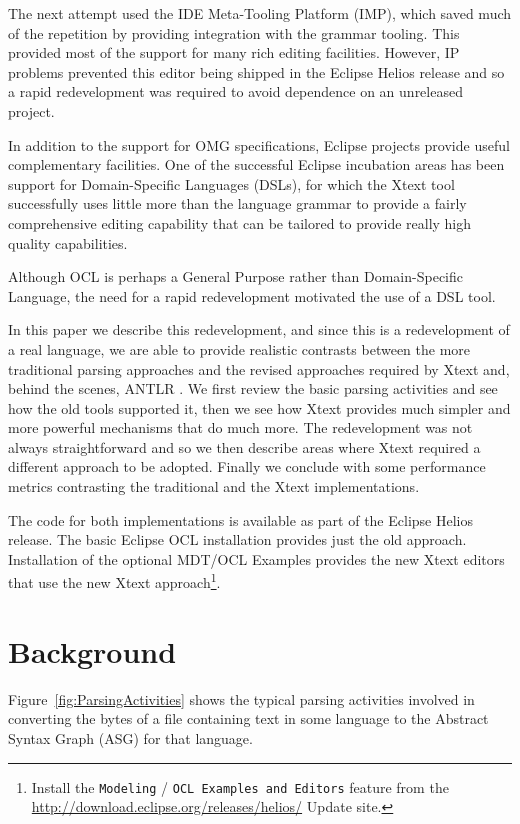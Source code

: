 \documentclass{eceasst}
\begin{document}
The next attempt used the IDE Meta-Tooling Platform (IMP)\cite{IMP}, which saved much of the repetition by providing integration with the grammar tooling. This provided most of the support for many rich editing facilities. However, IP problems prevented this editor being shipped in the Eclipse Helios\cite{Helios} release and so a rapid redevelopment was required to avoid dependence on an unreleased project.

In addition to the support for OMG specifications, Eclipse projects provide useful complementary facilities. One of the successful Eclipse incubation areas has been support for Domain-Specific Languages (DSLs), for which the Xtext\cite{TMF/Xtext} tool successfully uses little more than the language grammar to provide a fairly comprehensive editing capability that can be tailored to provide really high quality capabilities.

Although OCL is perhaps a General Purpose rather than Domain-Specific Language, the need for a rapid redevelopment motivated the use of a DSL tool.

In this paper we describe this redevelopment, and since this is a redevelopment of a real language, we are able to provide realistic contrasts between the more traditional parsing approaches and the revised approaches required by Xtext and, behind the scenes, ANTLR \cite{ANTLR}. We first review the basic parsing activities and see how the old tools supported it, then we see how Xtext provides much simpler and more powerful mechanisms that do much more. The redevelopment was not always straightforward and so we then describe areas where Xtext required a different approach to be adopted. Finally we conclude with some performance metrics contrasting the traditional and the Xtext implementations.

The code for both implementations is available as part of the Eclipse Helios release. The basic Eclipse OCL installation provides just the old approach. Installation of the optional MDT/OCL Examples provides the new Xtext editors that use the new Xtext approach\footnote{Install the {\tt Modeling} / {\tt OCL Examples and Editors} feature from the \url{http://download.eclipse.org/releases/helios/} Update site.}.

\section{Background}

Figure~\ref{fig:ParsingActivities} shows the typical parsing activities involved in converting the bytes of a file containing text in some language to the Abstract Syntax Graph (ASG)\cite{dragon} for that language.
	
\end{document}
